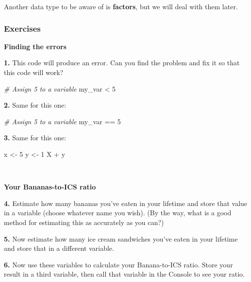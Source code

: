 \documentclass[
]{book}
\newenvironment{Shaded}{\begin{snugshade}}{\end{snugshade}}
\newcommand{\CommentTok}[1]{\textcolor[rgb]{0.56,0.35,0.01}{\textit{#1}}}
\newcommand{\DecValTok}[1]{\textcolor[rgb]{0.00,0.00,0.81}{#1}}
\newcommand{\NormalTok}[1]{#1}
\newcommand{\OtherTok}[1]{\textcolor[rgb]{0.56,0.35,0.01}{#1}}
\newcommand{\SpecialCharTok}[1]{\textcolor[rgb]{0.00,0.00,0.00}{#1}}
\begin{document}
Another data type to be aware of is \textbf{factors}, but we will deal with them later.

\hypertarget{exercises-2}{%
\subsubsection*{Exercises}\label{exercises-2}}

\textbf{Finding the errors}

\textbf{1.} This code will produce an error. Can you find the problem and fix it so that this code will work?

\begin{Shaded}
\begin{Highlighting}[]
\CommentTok{\# Assign 5 to a variable}
\NormalTok{my\_var }\SpecialCharTok{\textless{}} \DecValTok{5}
\end{Highlighting}
\end{Shaded}

\textbf{2.} Same for this one:

\begin{Shaded}
\begin{Highlighting}[]
\CommentTok{\# Assign 5 to a variable}
\NormalTok{my\_var }\SpecialCharTok{==} \DecValTok{5}
\end{Highlighting}
\end{Shaded}

\textbf{3.} Same for this one:

\begin{Shaded}
\begin{Highlighting}[]
\NormalTok{x }\OtherTok{\textless{}{-}} \DecValTok{5}
\NormalTok{y }\OtherTok{\textless{}{-}} \DecValTok{1}
\NormalTok{X }\SpecialCharTok{+}\NormalTok{ y}
\end{Highlighting}
\end{Shaded}

~

\textbf{Your Bananas-to-ICS ratio}

\textbf{4.} Estimate how many bananas you've eaten in your lifetime and store that value in a variable (choose whatever name you wish). (By the way, what is a good method for estimating this as accurately as you can?)

\textbf{5.} Now estimate how many ice cream sandwiches you've eaten in your lifetime and store that in a different variable.

\textbf{6.} Now use these variables to calculate your Banana-to-ICS ratio. Store your result in a third variable, then call that variable in the Console to see your ratio.
\end{document}
